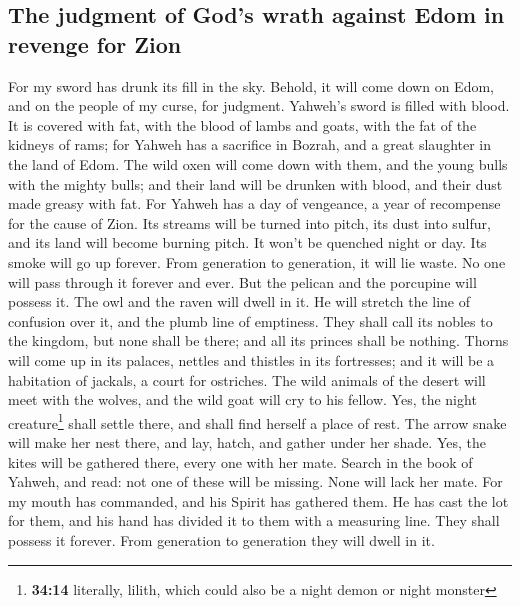 \hypertarget{the-judgment-of-gods-wrath-against-edom-in-revenge-for-zion}{%
\subsection{The judgment of God's wrath against Edom in revenge for
Zion}\label{the-judgment-of-gods-wrath-against-edom-in-revenge-for-zion}}

 For my sword has drunk its fill in the sky. Behold, it
will come down on Edom, and on the people of my curse, for judgment.
 Yahweh's sword is filled with blood. It is covered with
fat, with the blood of lambs and goats, with the fat of the kidneys of
rams; for Yahweh has a sacrifice in Bozrah, and a great slaughter in the
land of Edom.  The wild oxen will come down with them, and
the young bulls with the mighty bulls; and their land will be drunken
with blood, and their dust made greasy with fat.  For
Yahweh has a day of vengeance, a year of recompense for the cause of
Zion.  Its streams will be turned into pitch, its dust
into sulfur, and its land will become burning pitch.  It
won't be quenched night or day. Its smoke will go up forever. From
generation to generation, it will lie waste. No one will pass through it
forever and ever.  But the pelican and the porcupine will
possess it. The owl and the raven will dwell in it. He will stretch the
line of confusion over it, and the plumb line of emptiness.
 They shall call its nobles to the kingdom, but none
shall be there; and all its princes shall be nothing. 
Thorns will come up in its palaces, nettles and thistles in its
fortresses; and it will be a habitation of jackals, a court for
ostriches.  The wild animals of the desert will meet with
the wolves, and the wild goat will cry to his fellow. Yes, the night
creature\footnote{\textbf{34:14} literally, lilith, which could also be
  a night demon or night monster} shall settle there, and shall find
herself a place of rest.  The arrow snake will make her
nest there, and lay, hatch, and gather under her shade. Yes, the kites
will be gathered there, every one with her mate.  Search
in the book of Yahweh, and read: not one of these will be missing. None
will lack her mate. For my mouth has commanded, and his Spirit has
gathered them.  He has cast the lot for them, and his
hand has divided it to them with a measuring line. They shall possess it
forever. From generation to generation they will dwell in it.

